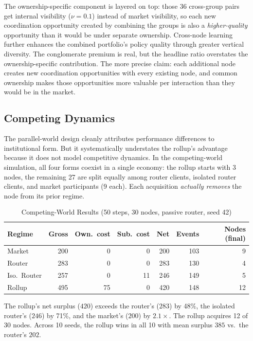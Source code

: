 \documentclass[12pt]{article}
\theoremstyle{definition}
\begin{document}
The ownership-specific component is layered on top: those 36 cross-group pairs get internal visibility ($\nu = 0.1$) instead of market visibility, so each new coordination opportunity created by combining the groups is also a \textit{higher-quality} opportunity than it would be under separate ownership. Cross-node learning further enhances the combined portfolio's policy quality through greater vertical diversity. The conglomerate premium is real, but the headline ratio overstates the ownership-specific contribution. The more precise claim: each additional node creates new coordination opportunities with every existing node, and common ownership makes those opportunities more valuable per interaction than they would be in the market.

\subsection{Competing Dynamics}
\label{sec:competing}

The parallel-world design cleanly attributes performance differences to institutional form. But it systematically understates the rollup's advantage because it does not model competitive dynamics. In the competing-world simulation, all four forms coexist in a single economy: the rollup starts with 3 nodes, the remaining 27 are split equally among router clients, isolated router clients, and market participants (9 each). Each acquisition \textit{actually removes} the node from its prior regime.

\begin{table}[H]
\centering
\caption{Competing-World Results (50 steps, 30 nodes, passive router, seed 42)}
\label{tab:competing}
\begin{tabular}{lrrrrrr}
\toprule
Regime & Gross & Own.\ cost & Sub.\ cost & Net & Events & Nodes (final) \\
\midrule
Market & 200 & 0 & 0 & 200 & 103 & 9 \\
Router & 283 & 0 & 0 & 283 & 130 & 4 \\
Iso.\ Router & 257 & 0 & 11 & 246 & 149 & 5 \\
Rollup & 495 & 75 & 0 & 420 & 148 & 12 \\
\bottomrule
\end{tabular}
\end{table}

The rollup's net surplus ($420$) exceeds the router's ($283$) by 48\%, the isolated router's ($246$) by 71\%, and the market's ($200$) by $2.1\times$. The rollup acquires 12 of 30 nodes. Across 10 seeds, the rollup wins in all 10 with mean surplus $385$ vs.\ the router's $202$.
\end{document}
